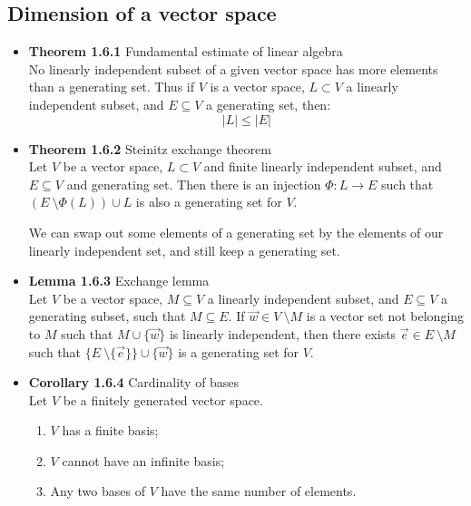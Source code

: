 \documentclass[11pt,a4paper]{article}
\begin{document}
\subsection{Dimension of a vector space}

\begin{itemize}

    \item \textbf{Theorem 1.6.1} Fundamental estimate of linear algebra \\
        No linearly independent subset of a given vector space has more elements than a
        generating set.
        Thus if $V$ is a vector space, $L \subset V$ a linearly independent subset,
        and $E \subseteq V$ a generating set, then:
        \[
            |L| \leq |E|
        \]

    \item \textbf{Theorem 1.6.2} Steinitz exchange theorem \\
        Let $V$ be a vector space, $L \subset V$ and finite linearly independent subset,
        and $E \subseteq V$ and generating set.
        Then there is an injection $\Phi : L \to E$ such that
        $(E \ \setminus \Phi(L)) \cup L$ is also a generating set for $V$.

        We can swap out some elements of a generating set by the elements of our linearly
        independent set, and still keep a generating set.

    \item \textbf{Lemma 1.6.3} Exchange lemma \\
        Let $V$ be a vector space, $M \subseteq V$ a linearly independent subset,
        and $E \subseteq V$ a generating subset, such that $M \subseteq E$.
        If $\vec{w} \in V \ \setminus M$ is a vector set not belonging to $M$ such that
        $M \cup \{\vec{w}\}$ is linearly independent, then there exists
        $\vec{e} \in E \ \setminus M$ such that
        $\{E \ \setminus \{\vec{e}\}\} \cup \{\vec{w} \}$ is a generating set for $V$.

    \item \textbf{Corollary 1.6.4} Cardinality of bases \\
        Let $V$ be a finitely generated vector space.
        \begin{enumerate}
            \item $V$ has a finite basis;
            \item $V$ cannot have an infinite basis;
            \item Any two bases of $V$ have the same number of elements.
        \end{enumerate}


\end{itemize}
\end{document}
